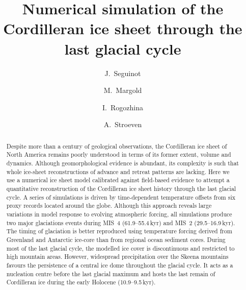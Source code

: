 \documentclass[tc, ms]{copernicus}
\begin{document}
\hack{\sloppy}

\title{Numerical simulation of the Cordilleran ice sheet
       through the last glacial cycle}

\author[1,2]{J.~Seguinot}
\author[3]{M.~Margold}
\author[2]{I.~Rogozhina}
\author[1]{A.~Stroeven}



\received{}
\accepted{}
\published{}

\maketitle

\begin{abstract}

  Despite more than a century of geological observations, the Cordilleran ice
  sheet of North America remains poorly understood in terms of its former
  extent, volume and dynamics. Although geomorphological evidence is abundant,
  its complexity is such that whole ice-sheet reconstructions of advance and
  retreat patterns are lacking. Here we use a numerical ice sheet model
  calibrated against field-based evidence to attempt a quantitative
  reconstruction of the Cordilleran ice sheet history through the last glacial
  cycle. A series of simulations is driven by time-dependent temperature
  offsets from six proxy records located around the globe. Although this
  approach reveals large variations in model response to evolving atmospheric
  forcing, all simulations produce two major glaciations events during MIS~4
  (61.9--55.4\,\unit{kyr}) and MIS~2 (29.5--16.9\,\unit{kyr}). The timing of
  glaciation is
  better reproduced using temperature forcing derived from Greenland and
  Antarctic ice-core than from regional ocean sediment cores. During most of
  the last glacial cycle, the modelled ice cover is discontinuous and
  restricted to high mountain areas. However, widespread precipitation over the
  Skeena mountains favours the persistence of a central ice dome throughout the
  glacial cycle. It acts as a nucleation centre before the last glacial maximum
  and hosts the last remain of Cordilleran ice during the
  early Holocene (10.9--9.5\,\unit{kyr}).

\end{abstract}
\end{document}

